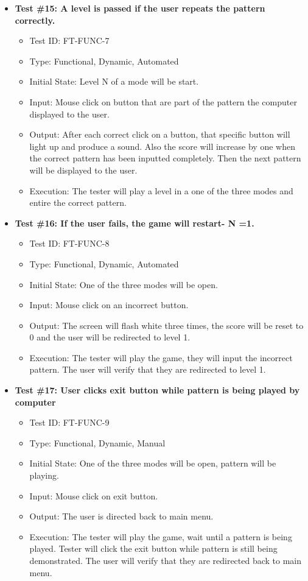 \documentclass[12pt, titlepage]{article}
\begin{document}
\begin{itemize}
\item \textbf{Test \#15: A level is passed if the user repeats the pattern correctly.}
\begin{itemize}
\item Test ID: FT-FUNC-7
\item Type: Functional, Dynamic, Automated		
\item Initial State: Level N of a mode will be start. 					
\item Input: Mouse click on button that are part of the pattern the computer displayed to the user.  	
\item Output: After each correct click on a button, that specific button will light up and produce a sound. Also the score will increase by one when the correct pattern has been inputted completely. Then the next pattern will be displayed to the user. 					
\item Execution: The tester will play a level in a one of the three modes and entire the correct pattern. 
\end{itemize}

\item \textbf{Test \#16: If the user fails, the game will restart- N =1.}
\begin{itemize}
\item Test ID: FT-FUNC-8
\item Type: Functional, Dynamic, Automated	
\item Initial State: One of the three modes will be open. 					
\item Input: Mouse click on an incorrect button. 					
\item Output: The screen will flash white three times, the score will be reset to 0 and the user will be redirected to level 1.
\item Execution: The tester will play the game, they will input the incorrect pattern. The user will verify that they are redirected to level 1.
\end{itemize}

\item \textbf{Test \#17: User clicks exit button while pattern is being played by computer}
\begin{itemize}
\item Test ID: FT-FUNC-9
\item Type: Functional, Dynamic, Manual	
\item Initial State: One of the three modes will be open, pattern will be playing. 					
\item Input: Mouse click on exit button. 					
\item Output: The user is directed back to main menu.					
\item Execution: The tester will play the game, wait until a pattern is being played. Tester will click the exit button while pattern is still being demonstrated. The user will verify that they are redirected back to main menu.
\end{itemize}


\end{itemize}
\end{document}
